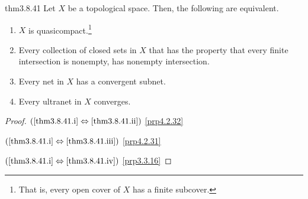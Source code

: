 \begin{thm}{}{thm3.8.41}
Let $X$ be a topological space.  Then, the following are equivalent.
\begin{enumerate}
\item \label{thm3.8.41.i}$X$ is quasicompact.\footnote{That is, every open cover of $X$ has a finite subcover.}
\item \label{thm3.8.41.ii}Every collection of closed sets in $X$ that has the property that every finite intersection is nonempty, has nonempty intersection.
\item \label{thm3.8.41.iii}Every net in $X$ has a convergent subnet.
\item \label{thm3.8.41.iv}Every ultranet in $X$ converges.
\end{enumerate}
\begin{proof}
$(\cref{thm3.8.41.i}\Leftrightarrow \cref{thm3.8.41.ii})$ \cref{prp4.2.32}

\blankline
\noindent
$(\cref{thm3.8.41.i}\Leftrightarrow \cref{thm3.8.41.iii})$ \cref{prp4.2.31}

\blankline
\noindent
$(\cref{thm3.8.41.i}\Leftrightarrow \cref{thm3.8.41.iv})$ \cref{prp3.3.16}
\end{proof}
\end{thm}